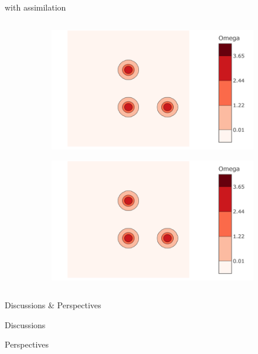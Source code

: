 \documentclass[aspectratio=169]{beamer} %
\begin{document}
\begin{frame}{with assimilation}
\begin{columns}
\begin{column}{0.5\textwidth}
            \begin{figure}
                \centering
                \begin{subfigure}{\textwidth}
                    \centering
                    \includegraphics[width=\textwidth]{images/vorticity_field.png}
                \end{subfigure}
                \begin{subfigure}{\textwidth}
                    \centering
                    \includegraphics[width=\textwidth]{images/vorticity_field.png}
                \end{subfigure}
            \end{figure}
        \end{column}
    \end{columns}
\end{frame}

\begin{frame}{Discussions & Perspectives}
    \begin{block}{Discussions}

    \end{block}{Perspectives}

    \begin{block}

    \end{block}
\end{frame}
\end{document}
